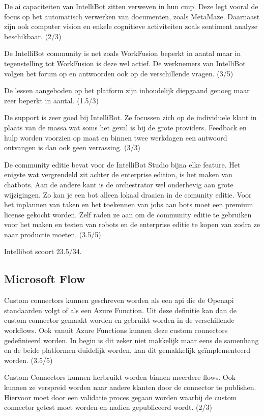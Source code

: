 De \acrshort{ai} capaciteiten van IntelliBot zitten verweven in hun \acrfull{cmp}. Deze legt vooral de focus op het automatisch verwerken van documenten, zoals MetaMaze. Daarnaast zijn ook computer vision en enkele cognitieve \gls{activiteit}en zoals sentiment analyse beschikbaar. (2/3)

De IntelliBot community is net zoals WorkFusion beperkt in aantal maar in tegenstelling tot WorkFusion is deze wel actief. De werknemers van IntelliBot volgen het forum op en antwoorden ook op de verschillende vragen. (3/5)

De lessen aangeboden op het platform zijn inhoudelijk diepgaand genoeg maar zeer beperkt in aantal. (1.5/3)

De support is zeer goed bij IntelliBot. Ze focussen zich op de individuele klant in plaats van de massa wat soms het geval is bij de grote providers. Feedback en hulp worden voorzien op maat en binnen twee werkdagen een antwoord ontvangen is dan ook geen verrassing. (3/3)

De community editie bevat voor de IntelliBot Studio bijna elke feature. Het enigste wat vergrendeld zit achter de enterprise edition, is het maken van chatbots. Aan de andere kant is de orchestrator wel onderhevig aan grote wijzigingen. Zo kan je een bot alleen lokaal draaien in de comunity editie. Voor het inplannen van taken en het toekennen van jobs aan bots moet een premium license gekocht worden. Zelf raden ze aan om de community editie te gebruiken voor het maken en testen van robots en de enterprise editie te kopen van zodra ze naar productie moeten. (3.5/5) 

Intellibot scoort 23.5/34.

\subsection{Microsoft Flow}

Custom connectors kunnen geschreven worden als een \acrshort{api} die de Open\acrshort{api} standaarden volgt of als een Azure Function. Uit deze definitie kan dan de custom connector gemaakt worden en gebruikt worden in de verschillende \gls{workflow}s. Ook vanuit Azure Functions kunnen deze custom connectors gedefinieerd worden. In begin is dit zeker niet makkelijk maar eens de samenhang en de beide platformen duidelijk worden, kan dit gemakkelijk geïmplementeerd worden. (3.5/5)

Custom Connectors kunnen herbruikt worden binnen meerdere flows. Ook kunnen ze verspreid worden naar andere klanten door de connector te publishen. Hiervoor moet door een validatie proces gegaan worden waarbij de custom connector getest moet worden en nadien gepubliceerd wordt. (2/3)

